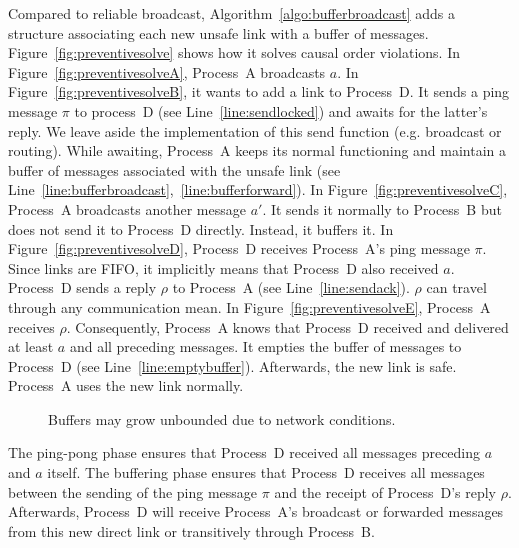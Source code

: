 Compared to reliable broadcast, Algorithm~\ref{algo:bufferbroadcast} adds a
structure associating each new unsafe link with a buffer of
messages. Figure~\ref{fig:preventivesolve} shows how it solves causal order
violations. In Figure~\ref{fig:preventivesolveA}, Process~A broadcasts $a$.  In
Figure~\ref{fig:preventivesolveB}, it wants to add a link to Process~D. It sends
a ping message $\pi$ to process~D (see Line~\ref{line:sendlocked}) and awaits
for the latter's reply.  We leave aside the implementation of this send function
(e.g. broadcast or routing). %
While awaiting, Process~A keeps its normal functioning and maintain a buffer of
messages associated with the unsafe link (see
Line~\ref{line:bufferbroadcast},~\ref{line:bufferforward}). In
Figure~\ref{fig:preventivesolveC}, Process~A broadcasts another message $a'$. It
sends it normally to Process~B but does not send it to Process~D
directly. Instead, it buffers it. In Figure~\ref{fig:preventivesolveD},
Process~D receives Process~A's ping message $\pi$. Since links are FIFO, it
implicitly means that Process~D also received $a$. Process~D sends a reply
$\rho$ to Process~A (see Line~\ref{line:sendack}). $\rho$ can travel through any
communication mean. In Figure~\ref{fig:preventivesolveE}, Process~A receives
$\rho$. Consequently, Process~A knows that Process~D received and delivered at
least $a$ and all preceding messages. It empties the buffer of messages to
Process~D (see Line~\ref{line:emptybuffer}). Afterwards, the new link is
safe. Process~A uses the new link normally.

\begin{figure*}
  \begin{center}
    \hspace{20pt}
    \hspace{20pt}
    \caption{\label{fig:bufferproblem}Buffers may grow unbounded due to network
      conditions.}
  \end{center}
\end{figure*}



The ping-pong phase ensures that Process~D received all messages preceding
$a$ and $a$ itself. The buffering phase ensures that Process~D receives all
messages between the sending of the ping message $\pi$ and the receipt of
Process~D's reply $\rho$. Afterwards, Process~D will receive
Process~A's broadcast or forwarded messages from this new direct link or
transitively through Process~B.

